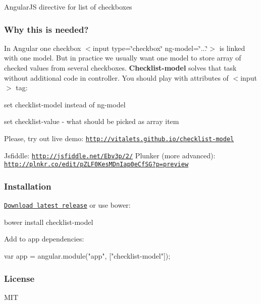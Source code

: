 Angular\+JS directive for list of checkboxes

\subsubsection*{Why this is needed?}

In Angular one checkbox {\ttfamily $<$input type=\char`\"{}checkbox\char`\"{} ng-\/model=\char`\"{}...\char`\"{}$>$} is linked with one model. But in practice we usually want one model to store array of checked values from several checkboxes. {\bfseries Checklist-\/model} solves that task without additional code in controller. You should play with attributes of {\ttfamily $<$input$>$} tag\+:


\begin{DoxyEnumerate}
\item set {\ttfamily checklist-\/model} instead of {\ttfamily ng-\/model}
\item set {\ttfamily checklist-\/value} -\/ what should be picked as array item
\end{DoxyEnumerate}

Please, try out live demo\+: \href{http://vitalets.github.io/checklist-model}{\tt http\+://vitalets.\+github.\+io/checklist-\/model}

Jsfiddle\+: \href{http://jsfiddle.net/Ebv3p/2/}{\tt http\+://jsfiddle.\+net/\+Ebv3p/2/} Plunker (more advanced)\+: \href{http://plnkr.co/edit/pZLF0KesMDnIap0eCfSG?p=preview}{\tt http\+://plnkr.\+co/edit/p\+Z\+L\+F0\+Kes\+M\+Dn\+Iap0e\+Cf\+S\+G?p=preview}

\subsubsection*{Installation}


\begin{DoxyEnumerate}
\item \href{https://github.com/vitalets/checklist-model/releases}{\tt Download latest release} or use bower\+: 
\begin{DoxyCode}
bower install checklist-model 
\end{DoxyCode}

\item Add to app dependencies\+: 
\begin{DoxyCode}
var app = angular.module("app", ["checklist-model"]);
\end{DoxyCode}

\end{DoxyEnumerate}

\subsubsection*{License}

M\+IT 
